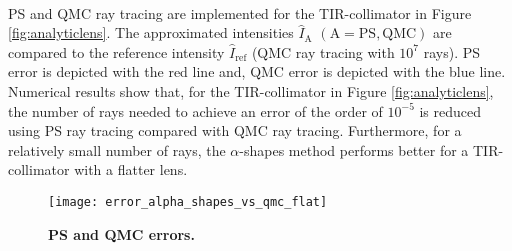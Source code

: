 \\ \indent PS and QMC ray tracing are implemented for the TIR-collimator in Figure \ref{fig:analyticlens}. The approximated intensities $\hat{I}_{\textrm{A}}$ $(\textrm{A} = \textrm{PS}, \textrm{QMC})$ are compared to the reference intensity $\hat{I}_{\textrm{ref}}$ (QMC ray tracing with $10^7$ rays).
PS error is depicted with the red line and, QMC error is depicted with the blue line. \\ \indent
Numerical results show that, for the TIR-collimator in Figure \ref{fig:analyticlens}, the number of rays needed to achieve an error of the order of $10^{-5}$ is reduced using PS ray tracing compared with QMC ray tracing. Furthermore, for a relatively small number of rays, the $\alpha$-shapes method performs better for a TIR-collimator with a flatter lens. 
\begin{figure}[t]
 \begin{center}
   \texttt{[image: error\_alpha\_shapes\_vs\_qmc\_flat]}
    \end{center}
     \caption{\textbf{PS and QMC errors.}}
 \label{fig:error2}
\end{figure}
